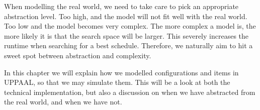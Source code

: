 When modelling the real world, we need to take care to pick an appropriate abstraction level. Too high, and the model will not fit well with the real world. Too low and the model becomes very complex. The more complex a model is, the more likely it is that the search space will be larger. This severely increases the runtime when searching for a best schedule. Therefore, we naturally aim to hit a sweet spot between abstraction and complexity.

In this chapter we will explain how we modelled configurations and items in UPPAAL, so that we may simulate them. This will be a look at both the technical implementation, but also a discussion on when we have abstracted from the real world, and when we have not.  




